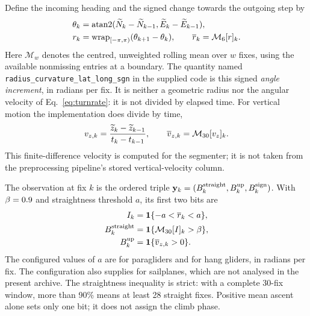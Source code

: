 Define the incoming heading and the signed change towards the outgoing step by
\begin{align}
 \theta_k &= \operatorname{atan2}(\widetilde N_k-\widetilde N_{k-1},
                                 \widetilde E_k-\widetilde E_{k-1}),\\
 r_k &= \operatorname{wrap}_{[-\pi,\pi)}(\theta_{k+1}-\theta_k),
 \qquad
 \overline r_k=\mathcal M_{6}[r]_k.
 \label{eq:vilpellet-turn}
\end{align}
Here $\mathcal M_w$ denotes the centred, unweighted rolling mean over $w$ fixes,
using the available nonmissing entries at a boundary. The quantity named
\texttt{radius\_curvature\_lat\_long\_sgn} in the supplied code is this signed
\emph{angle increment}, in radians per fix. It is neither a geometric radius nor
the angular velocity of Eq.~\eqref{eq:turnrate}: it is not divided by elapsed time.
For vertical motion the implementation does divide by time,
\begin{equation}
 v_{z,k}=\frac{\widetilde z_k-\widetilde z_{k-1}}{t_k-t_{k-1}},
 \qquad \overline v_{z,k}=\mathcal M_{30}[v_z]_k.
 \label{eq:vilpellet-vertical}
\end{equation}
This finite-difference velocity is computed for the segmenter; it is not taken from
the preprocessing pipeline's stored vertical-velocity column.

The observation at fix $k$ is the ordered triple
$\mathbf y_k=(B^{\rm straight}_k,B^{\rm up}_k,B^{\rm sign}_k)$.
With $\beta=0.9$ and straightness threshold $a$, its first two bits are
\begin{align}
 I_k &= \mathbf 1\{-a<\overline r_k<a\},\nonumber\\
 B^{\rm straight}_k &= \mathbf 1\{\mathcal M_{30}[I]_k>\beta\},
 \label{eq:vilpellet-straight}\\
 B^{\rm up}_k &= \mathbf 1\{\overline v_{z,k}>0\}.
 \label{eq:vilpellet-up}
\end{align}
The configured values of $a$ are \VilpAlphaPara{} for paragliders and
\VilpAlphaHang{} for hang gliders, in radians per fix. The configuration also supplies
\VilpAlphaSail{} for sailplanes, which are not analysed in the present archive.
The straightness inequality is strict: with a complete 30-fix window, more than
90\% means at least 28 straight fixes. Positive mean ascent alone sets only one bit;
it does not assign the climb phase.

